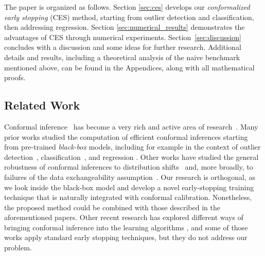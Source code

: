 The paper is organized as follows. Section \ref{sec:ces} develops our {\em conformalized early stopping} (CES) method, starting from outlier detection and classification, then addressing regression. Section \ref{sec:numerical_results} demonstrates the advantages of CES through numerical experiments. Section~\ref{sec:discussion} concludes with a discussion and some ideas for further research.
Additional details and results, including a theoretical analysis of the naive benchmark mentioned above, can be found in the Appendices, along with all mathematical proofs.

\subsection*{Related Work}

Conformal inference~\citep{saunders1999transduction,vovk1999machine,vovk2005algorithmic} has become a very rich and active area of research~\cite{lei2013distribution,lei2014distribution,lei2018distribution,barber2019predictive}.
Many prior works studied the computation of efficient conformal inferences starting from pre-trained {\em black-box} models, including for example in the context of outlier detection~\cite{smith2015conformal,guan2019prediction,bates2021testing,Liang_2022_integrative_p_val}, classification~\cite{vovk2003mondrian,hechtlinger2018cautious,romano2020classification,angelopoulos2020uncertainty,bates2021distributionfree}, and regression \cite{vovk2005algorithmic,lei2014distribution,romano2019conformalized}.
Other works have studied the general robustness of conformal inferences to distribution shifts~\cite{tibshirani2019conformal,sesia2022conformal} and, more broadly, to failures of the data exchangeability assumption~\cite{barber2022conformal,gibbs2022conformal}.
Our research is orthogonal, as we look inside the black-box model and develop a novel early-stopping training technique that is naturally integrated with conformal calibration. Nonetheless, the proposed method could be combined with those described in the aforementioned papers.
Other recent research has explored different ways of bringing conformal inference into the learning algorithms \cite{colombo2020training,bellotti2021optimized,stutz2021learning,einbinder2022training}, and some of those works apply standard early stopping techniques, but they do not address our problem.

